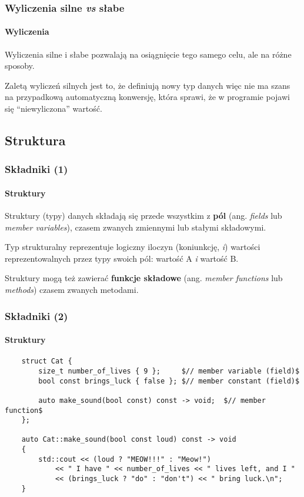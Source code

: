 \documentclass[aspectratio=169,10pt]{beamer}
\begin{document}
\begin{frame}[fragile]
    \frametitle{Wyliczenia silne \emph{vs} słabe}
    \framesubtitle{Wyliczenia}

    Wyliczenia silne i słabe pozwalają na osiągnięcie tego samego celu, ale na
    różne sposoby.

    \vspace{1em}

    Zaletą wyliczeń silnych jest to, że definiują nowy typ danych więc nie ma
    szans na przypadkową automatyczną konwersję, która sprawi, że w programie
    pojawi się ``niewyliczona'' wartość.
\end{frame}

\subsection{Struktura}

\begin{frame}[fragile]
    \frametitle{Składniki (1)}
    \framesubtitle{Struktury}

    Struktury (typy) danych składają się przede wszystkim z \textbf{pól} (ang.
    \emph{fields} lub \emph{member variables}), czasem zwanych zmiennymi lub
    stałymi składowymi.

    Typ strukturalny reprezentuje logiczny iloczyn (koniunkcję, \emph{i})
    wartości reprezentowalnych przez typy swoich pól: wartość A \emph{i} wartość
    B.

    \vspace{1em}

    Struktury mogą też zawierać \textbf{funkcje składowe} (ang. \emph{member
    functions} lub \emph{methods}) czasem zwanych metodami.
\end{frame}

\begin{frame}[fragile]
    \frametitle{Składniki (2)}
    \framesubtitle{Struktury}
    \label{struct_cat_example_full}

    {\scriptsize
    \begin{lstlisting}
    struct Cat {
        size_t number_of_lives { 9 };     $// member variable (field)$
        bool const brings_luck { false }; $// member constant (field)$

        auto make_sound(bool const) const -> void;  $// member function$
    };

    auto Cat::make_sound(bool const loud) const -> void
    {
        std::cout << (loud ? "MEOW!!!" : "Meow!")
            << " I have " << number_of_lives << " lives left, and I "
            << (brings_luck ? "do" : "don't") << " bring luck.\n";
    }
    \end{lstlisting}}
\end{frame}
\end{document}
